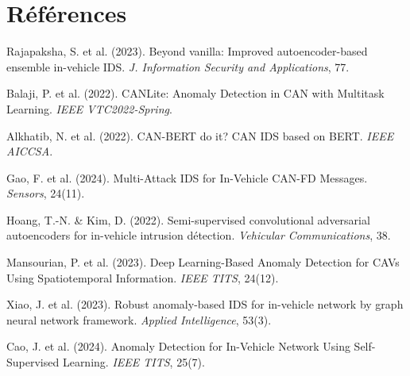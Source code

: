 \documentclass[12pt,a4paper]{article}
\begin{document}
\section*{Références}

\begin{enumerate}[noitemsep, label={[\arabic*]}]
    \item Rajapaksha, S. et al. (2023). Beyond vanilla: Improved autoencoder-based ensemble in-vehicle IDS. \textit{J. Information Security and Applications}, 77.
    \item Balaji, P. et al. (2022). CANLite: Anomaly Detection in CAN with Multitask Learning. \textit{IEEE VTC2022-Spring}.
    \item Alkhatib, N. et al. (2022). CAN-BERT do it? CAN IDS based on BERT. \textit{IEEE AICCSA}.
    \item Gao, F. et al. (2024). Multi-Attack IDS for In-Vehicle CAN-FD Messages. \textit{Sensors}, 24(11).
    \item Hoang, T.-N. \& Kim, D. (2022). Semi-supervised convolutional adversarial autoencoders for in-vehicle intrusion détection. \textit{Vehicular Communications}, 38.
    \item Mansourian, P. et al. (2023). Deep Learning-Based Anomaly Detection for CAVs Using Spatiotemporal Information. \textit{IEEE TITS}, 24(12).
    \item Xiao, J. et al. (2023). Robust anomaly-based IDS for in-vehicle network by graph neural network framework. \textit{Applied Intelligence}, 53(3).
    \item Cao, J. et al. (2024). Anomaly Detection for In-Vehicle Network Using Self-Supervised Learning. \textit{IEEE TITS}, 25(7).
\end{enumerate}
\end{document}
